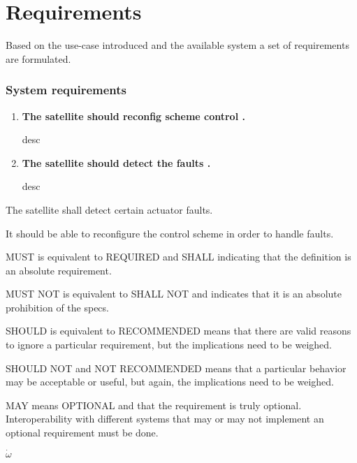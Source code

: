 \chapter{Requirements}\label{chap:requirements}
Based on the use-case introduced and the available system a set of requirements are formulated.
%
\subsection*{System requirements}
%
\begin{enumerate}
	\item \textbf{The satellite should reconfig scheme control .}
	
	desc
	
	\item \textbf{The satellite should detect the faults .}
	
	desc
	
\end{enumerate}

The satellite shall detect certain actuator faults.

It should be able to reconfigure the control scheme in order to handle faults. 



MUST is equivalent to REQUIRED and SHALL indicating that the definition is an absolute requirement.

MUST NOT is equivalent to SHALL NOT and indicates that it is an absolute prohibition of the specs.

SHOULD is equivalent to RECOMMENDED means that there are valid reasons to ignore a particular requirement, but the implications need to be weighed.

SHOULD NOT and NOT RECOMMENDED means that a particular behavior may be acceptable or useful, but again, the implications need to be weighed.

MAY means OPTIONAL and that the requirement is truly optional. Interoperability with different systems that may or may not implement an optional requirement must be done.

$\dot \omega $